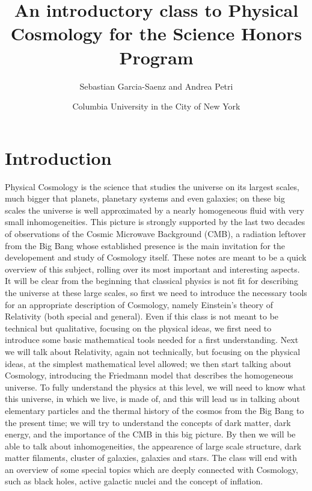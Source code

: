 \documentclass[11pt, a4paper,oneside,openright]{book}
\numberwithin{equation}{section}
\begin{document}
\title{An introductory class to Physical Cosmology for the Science Honors Program}
\author{Sebastian Garcia-Saenz and Andrea Petri}
\date{Columbia University in the City of New York}
\maketitle

\chapter*{Introduction}
Physical Cosmology is the science that studies the universe on its largest scales, much bigger that planets, planetary systems and even galaxies; on these big scales the universe is well approximated by a nearly homogeneous fluid with very small inhomogeneities. This picture is strongly supported by the last two decades of observations of the Cosmic Microwave Background (CMB), a radiation leftover from the Big Bang whose established presence is the main invitation for the developement and study of Cosmology itself. These notes are meant to be a quick overview of this subject, rolling over its most important and interesting aspects. It will be clear from the beginning that classical physics  is not fit for describing the universe at these large scales, so first we need to introduce the necessary tools for an appropriate description of Cosmology, namely Einstein's theory of Relativity (both special and general). Even if this class is not meant to be technical but qualitative, focusing on the physical ideas, we 
first need to introduce some basic mathematical tools needed for a first understanding. Next we will talk about Relativity, again not technically, but focusing on the physical ideas, at the simplest mathematical level allowed; we then start talking about Cosmology, introducing the Friedmann model that describes the homogeneous universe. To fully understand the physics at this level, we will need to know what this universe, in which we live, is made of, and this will lead us in talking about elementary particles and the thermal history of the cosmos from the Big Bang to the present time; we will try to understand the concepts of dark matter, dark energy, and the importance of the CMB in this big picture. By then we will be able to talk about inhomogeneities, the appearence of large scale structure, dark matter filaments, cluster of galaxies, galaxies and stars. The class will end with an overview of some special topics which are deeply connected with Cosmology, such as black holes, active galactic nuclei and 
the concept of inflation. 

\tableofcontents














\begin{thebibliography}{99}
\end{thebibliography}
\end{document}
